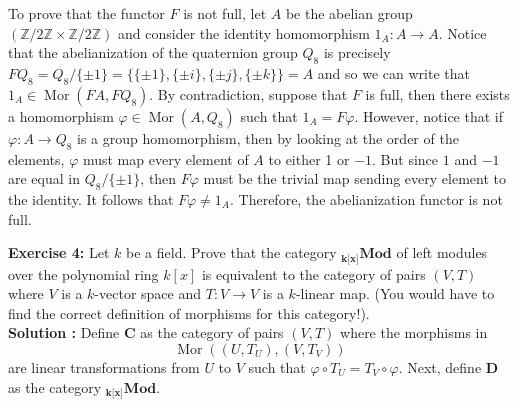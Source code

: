 \documentclass{article}
\newcommand{\Zn}[1]{\mathbb{Z}/ #1 \mathbb{Z}}
\newcommand{\CatC}{\textbf{C}}
\newcommand{\CatD}{\textbf{D}}
\newcommand{\CatMod}[1]{_\textbf{#1}\textbf{Mod}}
\DeclareMathOperator{\Mor}{Mor}
\begin{document}
To prove that the functor $F$ is not full, let $A$ be the abelian group $(\Zn{2} \times \Zn{2})$ and consider the identity homomorphism $1_A : A \to A$. Notice that the abelianization of the quaternion group $Q_8$ is precisely $FQ_8 = Q_8/\{\pm 1\} = \{\{\pm 1\}, \{\pm i\}, \{\pm j\}, \{\pm k\}\} = A$ and so we can write that $1_A \in \Mor(FA, FQ_8)$. By contradiction, suppose that $F$ is full, then there exists a homomorphism $\varphi \in \Mor(A, Q_8)$ such that $1_A = F\varphi$. However, notice that if $\varphi : A \to Q_8$ is a group homomorphism, then by looking at the order of the elements, $\varphi$ must map every element of $A$ to either 1 or $-1$. But since $1$ and $-1$ are equal in $Q_8 / \{\pm 1\}$, then $F\varphi$ must be the trivial map sending every element to the identity. It follows that $F\varphi \neq 1_A$. Therefore, the abelianization functor is not full.

\newpage

\noindent \textbf{Exercise 4:} Let $k$ be a field. Prove that the category $\CatMod{k[x]}$ of left modules over the polynomial ring $k[x]$ is equivalent to the category of pairs $(V,T)$ where $V$ is a $k$-vector space and $T : V \to V$ is a $k$-linear map. (You would have to find the correct definition of morphisms for this category!). \\

\noindent \textbf{Solution :} Define $\CatC$ as the category of pairs $(V,T)$ where the morphisms in $$\Mor((U,T_U),(V,T_V))$$ are linear transformations from $U$ to $V$ such that $\varphi \circ T_U = T_V \circ \varphi$. Next, define $\CatD$ as the category $\CatMod{k[x]}$.
\end{document}
